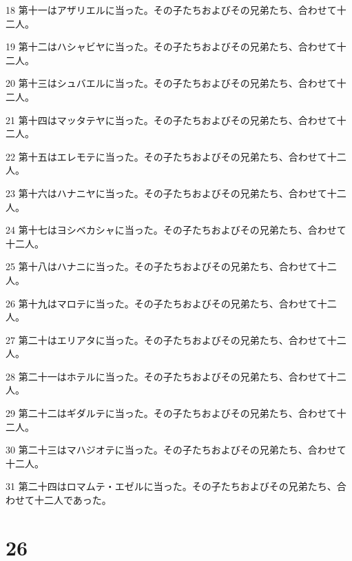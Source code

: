 \par 18 第十一はアザリエルに当った。その子たちおよびその兄弟たち、合わせて十二人。
\par 19 第十二はハシャビヤに当った。その子たちおよびその兄弟たち、合わせて十二人。
\par 20 第十三はシュバエルに当った。その子たちおよびその兄弟たち、合わせて十二人。
\par 21 第十四はマッタテヤに当った。その子たちおよびその兄弟たち、合わせて十二人。
\par 22 第十五はエレモテに当った。その子たちおよびその兄弟たち、合わせて十二人。
\par 23 第十六はハナニヤに当った。その子たちおよびその兄弟たち、合わせて十二人。
\par 24 第十七はヨシベカシャに当った。その子たちおよびその兄弟たち、合わせて十二人。
\par 25 第十八はハナニに当った。その子たちおよびその兄弟たち、合わせて十二人。
\par 26 第十九はマロテに当った。その子たちおよびその兄弟たち、合わせて十二人。
\par 27 第二十はエリアタに当った。その子たちおよびその兄弟たち、合わせて十二人。
\par 28 第二十一はホテルに当った。その子たちおよびその兄弟たち、合わせて十二人。
\par 29 第二十二はギダルテに当った。その子たちおよびその兄弟たち、合わせて十二人。
\par 30 第二十三はマハジオテに当った。その子たちおよびその兄弟たち、合わせて十二人。
\par 31 第二十四はロマムテ・エゼルに当った。その子たちおよびその兄弟たち、合わせて十二人であった。

\chapter{26}


